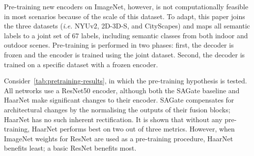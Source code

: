 \documentclass{article}
\def\ie{\emph{i.e. }}
\begin{document}
Pre-training new encoders on ImageNet, however, is not computationally feasible in most scenarios because of the scale of this dataset.
To adapt, this paper joins the three datasets (\ie NYUv2, 2D-3D-S, and CityScapes) and maps all semantic labels to a joint set of 67 labels, including semantic classes from both indoor and outdoor scenes.
Pre-training is performed in two phases: first, the decoder is frozen and the encoder is trained using the joint dataset. 
Second, the decoder is trained on a specific dataset with a frozen encoder.

Consider~\autoref{tab:pretraining-results}, in which the pre-training hypothesis is tested.
All networks use a ResNet50 encoder, although both the SAGate baseline and HaarNet make significant changes to their encoder.
SAGate compensates for architectural changes by the normalising the outputs of their fusion blocks; HaarNet has no such inherent rectification.
It is shown that without any pre-training, HaarNet performs best on two out of three metrics.
However, when ImageNet weights for ResNet are used as a pre-training procedure, HaarNet benefits least; a basic ResNet benefits most.
\end{document}
